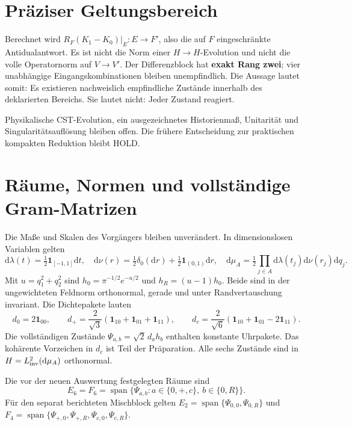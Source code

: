 \documentclass[10pt,a4paper]{article}
\newcommand{\dd}{\mathrm d}\newcommand{\one}{\mathbf1}\newcommand{\D}{\mathcal D}
\begin{document}
\section*{Präziser Geltungsbereich}
Berechnet wird $R_F(K_1-K_0)|_E:E\to F'$, also die auf $F$ eingeschränkte
Antidualantwort. Es ist nicht die Norm einer $H\to H$-Evolution und nicht die
volle Operatornorm auf $V\to V'$. Der Differenzblock hat \textbf{exakt Rang zwei};
vier unabhängige Eingangskombinationen bleiben unempfindlich.
Die Aussage lautet somit: Es existieren nachweislich empfindliche Zustände
innerhalb des deklarierten Bereichs. Sie lautet nicht: Jeder Zustand reagiert.

Physikalische CST-Evolution, ein ausgezeichnetes Historienmaß, Unitarität
und Singularitätsauflösung bleiben offen. Die frühere Entscheidung zur
praktischen kompakten Reduktion bleibt HOLD.

\newpage
\section{Räume, Normen und vollständige Gram-Matrizen}
Die Maße und Skalen des Vorgängers bleiben unverändert. In dimensionslosen
Variablen gelten
\[
 \dd\lambda(t)=\tfrac12\one_{[-1,1]}\dd t,\quad
 \dd\nu(r)=\tfrac12\delta_0(\dd r)+\tfrac12\one_{(0,1)}\dd r,\quad
 \dd\mu_A=\tfrac12\prod_{j\in A}\dd\lambda(t_j)\dd\nu(r_j)\dd q_j.
\]
Mit $u=q_1^2+q_2^2$ sind $h_0=\pi^{-1/2}e^{-u/2}$ und
$h_R=(u-1)h_0$. Beide sind in der ungewichteten Feldnorm orthonormal,
gerade und unter Randvertauschung invariant. Die Dichtepakete lauten
\[
 d_0=2\one_{00},\qquad
 d_+=\frac2{\sqrt3}(\one_{10}+\one_{01}+\one_{11}),\qquad
 d_c=\frac2{\sqrt6}(\one_{10}+\one_{01}-2\one_{11}).
\]
Die vollständigen Zustände $\Psi_{a,b}=\sqrt2\,d_a h_b$ enthalten konstante
Uhrpakete. Das kohärente Vorzeichen in $d_c$ ist Teil der Präparation.
Alle sechs Zustände sind in $H=L^2_{\rm inv}(\dd\mu_A)$ orthonormal.

Die vor der neuen Auswertung festgelegten Räume sind
\[
 E_6=F_6=\operatorname{span}\{\Psi_{a,b}:a\in\{0,+,c\},\ b\in\{0,R\}\}.
\]
Für den separat berichteten Mischblock gelten
$E_2=\operatorname{span}\{\Psi_{0,0},\Psi_{0,R}\}$ und
$F_4=\operatorname{span}\{\Psi_{+,0},\Psi_{+,R},\Psi_{c,0},\Psi_{c,R}\}$.
\end{document}
